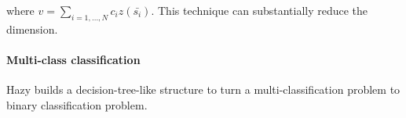 where $v=\sum_{i=1,\dots,N}c_iz(\bar{s_i})$. This technique can substantially reduce the dimension.

\paragraph{Multi-class classification}
Hazy builds a decision-tree-like structure to turn a multi-classification problem to binary classification problem.


